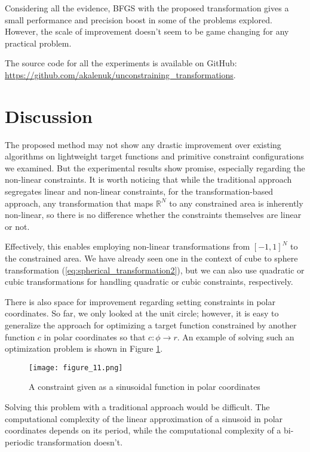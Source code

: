 \documentclass[
	a4paper, %
	10pt, %
	unnumberedsections, %
	twoside, %
]{LTJournalArticle}
\begin{document}
Considering all the evidence, BFGS with the proposed transformation gives a small performance and precision boost in some of the problems explored. However, the scale of improvement doesn't seem to be game changing for any practical problem.

The source code for all the experiments is available on GitHub: \url{https://github.com/akalenuk/unconstraining_transformations}.

\section{Discussion}

The proposed method may not show any drastic improvement over existing algorithms on lightweight target functions and primitive constraint configurations we examined. But the experimental results show promise, especially regarding the non-linear constraints. It is worth noticing that while the traditional approach segregates linear and non-linear constraints, for the transformation-based approach, any transformation that maps $\mathbb{R}^N$ to any constrained area is inherently non-linear, so there is no difference whether the constraints themselves are linear or not.

Effectively, this enables employing non-linear transformations from $[-1, 1]^N$ to the constrained area. We have already seen one in the context of cube to sphere transformation (\ref{eq:spherical_transformation2}), but we can also use quadratic or cubic transformations for handling quadratic or cubic constraints, respectively.

There is also space for improvement regarding setting constraints in polar coordinates. So far, we only looked at the unit circle; however, it is easy to generalize the approach for optimizing a target function constrained by another function $c$ in polar coordinates so that $c: \phi \rightarrow r$. An example of solving such an optimization problem is shown in Figure \ref{fig:polar_constrained}.

\begin{figure} 
	\texttt{[image: figure\_11.png]}
	\caption{A constraint given as a sinusoidal function in polar coordinates}
	\label{fig:polar_constrained}
\end{figure}

Solving this problem with a traditional approach would be difficult. The computational complexity of the linear approximation of a sinusoid in polar coordinates depends on its period, while the computational complexity of a bi-periodic transformation doesn't.
\end{document}
